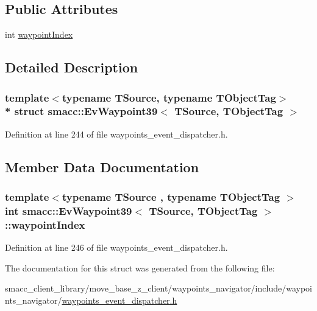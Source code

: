 \subsection*{Public Attributes}
\begin{DoxyCompactItemize}
\item 
int \hyperlink{structsmacc_1_1EvWaypoint39_a4bae483027feaf052c27587db402d406}{waypoint\+Index}
\end{DoxyCompactItemize}


\subsection{Detailed Description}
\subsubsection*{template$<$typename T\+Source, typename T\+Object\+Tag$>$\\*
struct smacc\+::\+Ev\+Waypoint39$<$ T\+Source, T\+Object\+Tag $>$}



Definition at line 244 of file waypoints\+\_\+event\+\_\+dispatcher.\+h.



\subsection{Member Data Documentation}
\subsubsection[{\texorpdfstring{waypoint\+Index}{waypointIndex}}]{\setlength{\rightskip}{0pt plus 5cm}template$<$typename T\+Source , typename T\+Object\+Tag $>$ int {\bf smacc\+::\+Ev\+Waypoint39}$<$ T\+Source, T\+Object\+Tag $>$\+::waypoint\+Index}\hypertarget{structsmacc_1_1EvWaypoint39_a4bae483027feaf052c27587db402d406}{}\label{structsmacc_1_1EvWaypoint39_a4bae483027feaf052c27587db402d406}


Definition at line 246 of file waypoints\+\_\+event\+\_\+dispatcher.\+h.



The documentation for this struct was generated from the following file\+:\begin{DoxyCompactItemize}
\item 
smacc\+\_\+client\+\_\+library/move\+\_\+base\+\_\+z\+\_\+client/waypoints\+\_\+navigator/include/waypoints\+\_\+navigator/\hyperlink{waypoints__event__dispatcher_8h}{waypoints\+\_\+event\+\_\+dispatcher.\+h}\end{DoxyCompactItemize}
